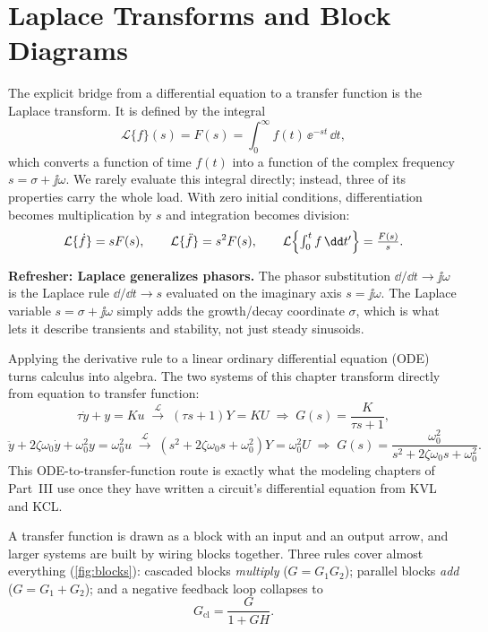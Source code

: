 \section{Laplace Transforms and Block Diagrams}
The explicit bridge from a differential equation to a transfer function is the
Laplace transform. It is defined by the integral
\[
\mathcal{L}\{f\}(s)=F(s)=\int_0^\infty f(t)\,\ee^{-st}\,\dd t,
\]
which converts a function of time \(f(t)\) into a function of the complex
frequency \(s=\sigma+\jj\omega\). We rarely evaluate this integral directly;
instead, three of its properties carry the whole load. With zero initial
conditions, differentiation becomes multiplication by \(s\) and integration
becomes division:
\[
\mathcal{L}\{\dot f\}=sF(s),\qquad
\mathcal{L}\{\ddot f\}=s^2F(s),\qquad
\mathcal{L}\Bigl\{\textstyle\int_0^t f\,\dd t'\Bigr\}=\frac{F(s)}{s}.
\]

\begin{controlsbox}
\textbf{Refresher: Laplace generalizes phasors.} The phasor substitution
\(\dd/\dd t\to\jj\omega\) is the Laplace rule \(\dd/\dd t\to s\) evaluated on the
imaginary axis \(s=\jj\omega\). The Laplace variable \(s=\sigma+\jj\omega\) simply
adds the growth/decay coordinate \(\sigma\), which is what lets it describe
transients and stability, not just steady sinusoids.
\end{controlsbox}

Applying the derivative rule to a linear ordinary differential equation (ODE)
turns calculus into algebra. The two
systems of this chapter transform directly from equation to transfer function:
\[
\tau\dot y+y=Ku
\;\xrightarrow{\;\mathcal L\;}\;
(\tau s+1)Y=KU
\;\Rightarrow\;
G(s)=\frac{K}{\tau s+1},
\]
\[
\ddot y+2\zeta\omega_0\dot y+\omega_0^2 y=\omega_0^2u
\;\xrightarrow{\;\mathcal L\;}\;
(s^2+2\zeta\omega_0 s+\omega_0^2)Y=\omega_0^2U
\;\Rightarrow\;
G(s)=\frac{\omega_0^2}{s^2+2\zeta\omega_0 s+\omega_0^2}.
\]
This ODE-to-transfer-function route is exactly what the modeling chapters of
Part~III use once they have written a circuit's differential equation from KVL
and KCL.

A transfer function is drawn as a block with an input and an output arrow, and
larger systems are built by wiring blocks together. Three rules cover almost
everything (\cref{fig:blocks}): cascaded blocks \emph{multiply}
(\(G=G_1G_2\)); parallel blocks \emph{add} (\(G=G_1+G_2\)); and a negative
feedback loop collapses to
\[
G_{\mathrm{cl}}=\frac{G}{1+GH}.
\]

